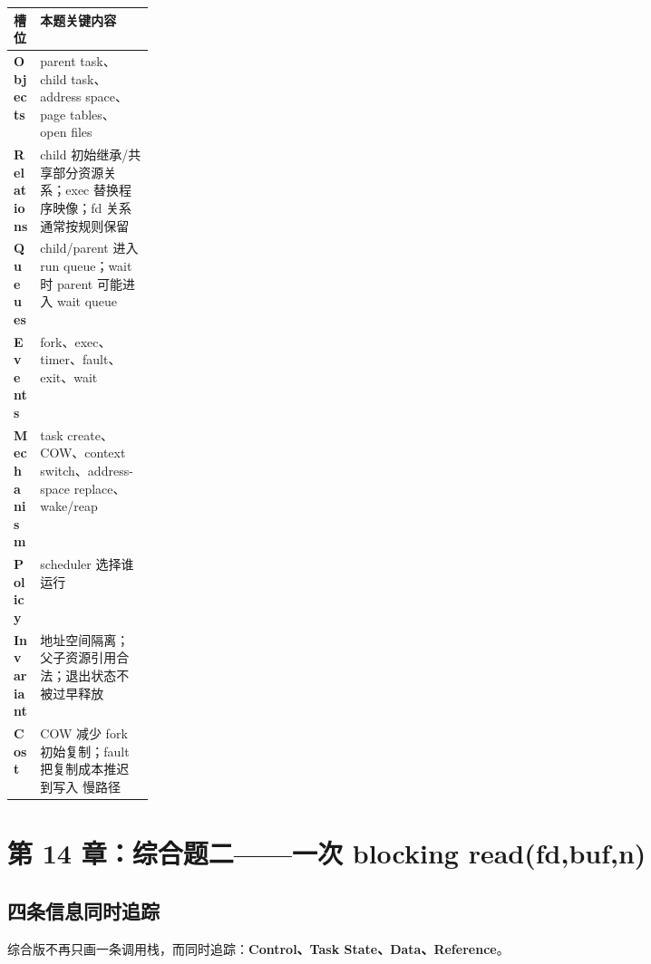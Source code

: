 \documentclass[11pt,a4paper]{ctexart}
\newcommand{\kw}[1]{\textbf{#1}}
\begin{document}
\begin{center}
\small
\renewcommand{\arraystretch}{1.25}
\begin{tabularx}{\linewidth}{>{\bfseries}p{0.18\linewidth} X}
\toprule
槽位 & 本题关键内容 \\
\midrule
Objects & parent task、child task、address space、page tables、open files \\
Relations & child 初始继承/共享部分资源关系；exec 替换程序映像；fd 关系通常按规则保留 \\
Queues & child/parent 进入 run queue；wait 时 parent 可能进入 wait queue \\
Events & fork、exec、timer、fault、exit、wait \\
Mechanism & task create、COW、context switch、address-space replace、wake/reap \\
Policy & scheduler 选择谁运行 \\
Invariant & 地址空间隔离；父子资源引用合法；退出状态不被过早释放 \\
Cost & COW 减少 fork 初始复制；fault 把复制成本推迟到写入 慢路径 \\
\bottomrule
\end{tabularx}
\end{center}

\section{第 14 章：综合题二——一次 blocking read(fd,buf,n)}

\subsection{四条信息同时追踪}
综合版不再只画一条调用栈，而同时追踪：\kw{Control、Task State、Data、Reference}。
\end{document}
